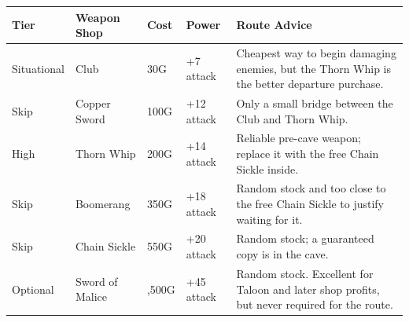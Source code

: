 \documentclass[
  american,
  10pt,
  letterpaper,
  oneside,
  open=any]{scrreprt}
\newcounter{none} %
\newenvironment{guidetable}{%
  \small\setstretch{1.0}%
  \setlength{\tabcolsep}{4pt}%
  \setlength{\LTpre}{8pt}\setlength{\LTpost}{10pt}%
  \renewcommand{\arraystretch}{1.16}%
}{ }
\begin{document}
\begin{guidetable}

{\def\LTcaptype{none} %
\begin{longtable}[]{@{}
  >{\raggedright\arraybackslash}p{}
  >{\raggedright\arraybackslash}p{}
  >{\raggedleft\arraybackslash}p{}
  >{\raggedleft\arraybackslash}p{}
  >{\raggedright\arraybackslash}p{}@{}}
\toprule\noalign{}
\begin{minipage}[b]{\linewidth}\raggedright
\color{GuideGreen}\bfseries Tier
\end{minipage} & \begin{minipage}[b]{\linewidth}\raggedright
\color{GuideGreen}\bfseries Weapon Shop
\end{minipage} & \begin{minipage}[b]{\linewidth}\raggedleft
\color{GuideGreen}\bfseries Cost
\end{minipage} & \begin{minipage}[b]{\linewidth}\raggedleft
\color{GuideGreen}\bfseries Power
\end{minipage} & \begin{minipage}[b]{\linewidth}\raggedright
\color{GuideGreen}\bfseries Route Advice
\end{minipage} \\
\midrule\noalign{}
\endhead
\bottomrule\noalign{}
\endlastfoot
Situational & Club & 30G & +7 attack & Cheapest way to begin damaging
enemies, but the Thorn Whip is the better departure purchase. \\
Skip & Copper Sword & 100G & +12 attack & Only a small bridge between
the Club and Thorn Whip. \\
High & Thorn Whip & 200G & +14 attack & Reliable pre-cave weapon;
replace it with the free Chain Sickle inside. \\
Skip & Boomerang & 350G & +18 attack & Random stock and too close to the
free Chain Sickle to justify waiting for it. \\
Skip & Chain Sickle & 550G & +20 attack & Random stock; a guaranteed
copy is in the cave. \\
Optional & Sword of Malice & 3,500G & +45 attack & Random stock.
Excellent for Taloon and later shop profits, but never required for the
route. \\
\end{longtable}
}

\end{guidetable}
\end{document}
